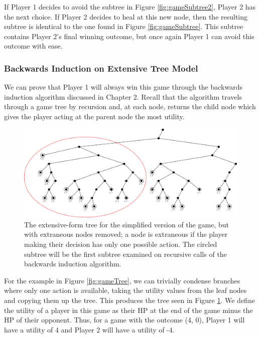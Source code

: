 If Player 1 decides to avoid the subtree in Figure \ref{fig:gameSubtree2}, Player 2 has the next choice. If Player 2 decides to heal at this new node, then the resulting subtree is identical to the one found in Figure \ref{fig:gameSubtree}. This subtree contains Player 2's final winning outcome, but once again Player 1 can avoid this outcome with ease.\\

\subsubsection{Backwards Induction on Extensive Tree Model}
We can prove that Player 1 will always win this game through the backwards induction algorithm discussed in Chapter 2. Recall that the algorithm travels through a game tree by recursion and, at each node, returns the child node which gives the player acting at the parent node the most utility.

\begin{figure}[H]
  \centering
  \includegraphics[width=13cm]{figures/Backwards0.png}
  \caption{The extensive-form tree for the simplified version of the game, but with extraneous nodes removed; a node is extraneous if the player making their decision has only one possible action. The circled subtree will be the first subtree examined on recursive calls of the backwards induction algorithm.}
  \label{fig:condensedTree}
\end{figure}

For the example in Figure \ref{fig:gameTree}, we can trivially condense branches where only one action is available, taking the utility values from the leaf nodes and copying them up the tree. This produces the tree seen in Figure \ref{fig:condensedTree}. We define the utility of a player in this game as their HP at the end of the game minus the HP of their opponent. Thus, for a game with the outcome (4, 0), Player 1 will have a utility of 4 and Player 2 will have a utility of -4.\\

